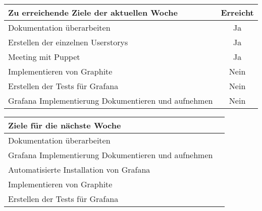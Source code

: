 \begin{tabularx}{\textwidth}{Xc}
    \arrayrulecolor{OliveGreen}
    \toprule
    {\bfseries Zu erreichende Ziele der aktuellen Woche} & {\bfseries Erreicht} \\
    \midrule[2pt]
    Dokumentation überarbeiten                              &Ja              \\
    \rowcolor{OliveGreen!15}
    Erstellen der einzelnen Userstorys                      &Ja              \\
    \rowcolor{White}
    Meeting mit Puppet                                      &Ja              \\
    \rowcolor{OliveGreen!15}
    Implementieren von Graphite                           &Nein              \\
    \rowcolor{White}
    Erstellen der Tests für Grafana                       &Nein              \\
    \rowcolor{OliveGreen!15}
    Grafana Implementierung Dokumentieren und aufnehmen   &Nein              \\
    \bottomrule[2pt]
\end{tabularx}
%
\vspace{1cm}
%
\begin{tabularx}{\textwidth}{Xc}
    \arrayrulecolor{OliveGreen}
    \toprule
    {\bfseries Ziele für die nächste Woche}        &                         \\
    \midrule[2pt]
    Dokumentation überarbeiten                     &                         \\
    \rowcolor{OliveGreen!15}
    Grafana Implementierung Dokumentieren und aufnehmen   &                  \\
    \rowcolor{White}
    Automatisierte Installation von Grafana        &                         \\
    \rowcolor{OliveGreen!15}
    Implementieren von Graphite                   &                          \\
    \rowcolor{White}
    Erstellen der Tests für Grafana               &                          \\
\end{tabularx}
